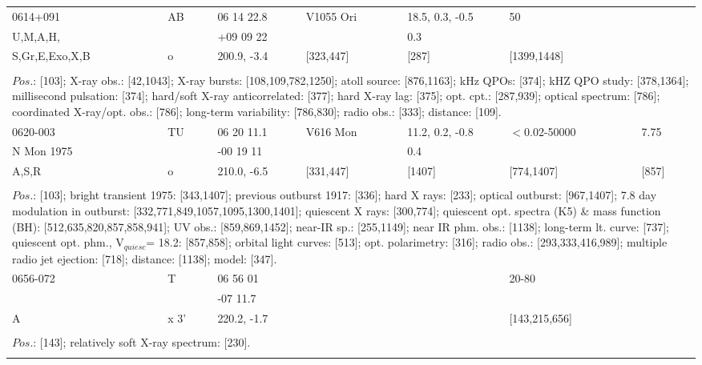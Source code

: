 \documentclass{aa}
\begin{document}
\begin{tabular}{p{2.5cm}p{1cm}p{1.8cm}p{2.3cm}p{3.3cm}p{2.0cm}p{2.2cm}}
\noalign{\smallskip}
0614+091                & AB   & 06 14 22.8       & V1055 Ori        & 18.5, 0.3, -0.5    & 50                      &      \\
U,M,A,H,                  &          & +09 09 22        &                           & 0.3                       &                            &    \\
S,Gr,E,Exo,X,B      & o      & 200.9, -3.4       & [323,447]          & [287]                   & [1399,1448]     &    \\
\\
\multicolumn{7}{p{17.5cm}}{
$Pos$.: [103]; X-ray obs.: [42,1043]; X-ray bursts: [108,109,782,1250]; atoll source: [876,1163]; kHz QPOs: [374]; 
kHZ QPO study: [378,1364]; millisecond pulsation: [374]; hard/soft X-ray anticorrelated: [377]; hard X-ray lag: [375]; 
opt. cpt.: [287,939]; optical spectrum: [786]; coordinated X-ray/opt. obs.: [786]; long-term variability: [786,830]; 
radio obs.: [333]; distance: [109].}\\
\noalign{\smallskip}
\hline

\noalign{\smallskip}
0620-003        & TU          & 06 20 11.1      & V616 Mon     & 11.2, 0.2, -0.8      & $<$0.02-50000     & 7.75     \\
N Mon 1975   &               & -00 19 11         &                         & 0.4                       &                                 &             \\
A,S,R               & o            & 210.0, -6.5       & [331,447]      &  [1407]                & [774,1407]             & [857]    \\
\\
\multicolumn{7}{p{17.5cm}}{
$Pos$.: [103]; bright transient 1975: [343,1407]; previous outburst 1917: [336]; hard X rays: [233]; optical outburst: 
[967,1407]; 7.8 day modulation in outburst: [332,771,849,1057,1095,1300,1401]; quiescent X rays: [300,774];
quiescent opt. spectra (K5) \& mass function (BH): [512,635,820,857,858,941]; UV obs.: [859,869,1452]; near-IR sp.: 
[255,1149]; near IR phm. obs.: [1138]; long-term lt. curve: [737]; quiescent opt. phm., V$_{quiesc}$= 18.2: [857,858]; 
orbital light curves: [513]; opt. polarimetry: [316]; radio obs.: [293,333,416,989]; multiple radio jet ejection: [718]; 
distance: [1138]; model: [347].}\\
\noalign{\smallskip}
\hline

\noalign{\smallskip}
0656-072         & T            & 06 56 01        &                    &                    & 20-80                 &      \\
                          &               & -07 11.7         &                     &                    &                            &    \\
A                       & x 3'         & 220.2, -1.7     &                    &                     & [143,215,656]  &    \\
\\
\multicolumn{7}{p{17.5cm}}{
$Pos$.: [143]; relatively soft X-ray spectrum: [230].}\\
\noalign{\smallskip}
\hline

\end{tabular}
\end{document}
